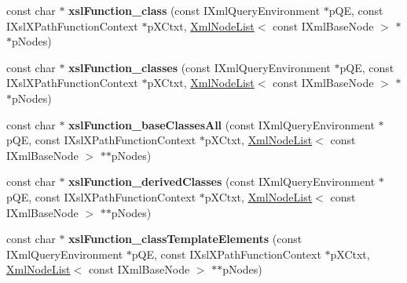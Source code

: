 \begin{DoxyCompactItemize}
\item 
\hypertarget{group__XSLModule-Functions_ga18e9a88a14db42649b02c6adb815b78a}{const char $\ast$ {\bfseries xsl\-Function\-\_\-class} (const \-I\-Xml\-Query\-Environment $\ast$p\-Q\-E, const \-I\-Xsl\-X\-Path\-Function\-Context $\ast$p\-X\-Ctxt, \hyperlink{classgeneral__server_1_1XmlNodeList}{\-Xml\-Node\-List}$<$ const \-I\-Xml\-Base\-Node $>$ $\ast$$\ast$p\-Nodes)}\label{group__XSLModule-Functions_ga18e9a88a14db42649b02c6adb815b78a}

\item 
\hypertarget{group__XSLModule-Functions_ga5e92759166ded9b8aa524e87e2256930}{const char $\ast$ {\bfseries xsl\-Function\-\_\-classes} (const \-I\-Xml\-Query\-Environment $\ast$p\-Q\-E, const \-I\-Xsl\-X\-Path\-Function\-Context $\ast$p\-X\-Ctxt, \hyperlink{classgeneral__server_1_1XmlNodeList}{\-Xml\-Node\-List}$<$ const \-I\-Xml\-Base\-Node $>$ $\ast$$\ast$p\-Nodes)}\label{group__XSLModule-Functions_ga5e92759166ded9b8aa524e87e2256930}

\item 
\hypertarget{group__XSLModule-Functions_ga840d1f80d66322355f2735ddf607837a}{const char $\ast$ {\bfseries xsl\-Function\-\_\-base\-Classes\-All} (const \-I\-Xml\-Query\-Environment $\ast$p\-Q\-E, const \-I\-Xsl\-X\-Path\-Function\-Context $\ast$p\-X\-Ctxt, \hyperlink{classgeneral__server_1_1XmlNodeList}{\-Xml\-Node\-List}$<$ const \-I\-Xml\-Base\-Node $>$ $\ast$$\ast$p\-Nodes)}\label{group__XSLModule-Functions_ga840d1f80d66322355f2735ddf607837a}

\item 
\hypertarget{group__XSLModule-Functions_ga830eb53620cc28de2d5beb595acaa0d3}{const char $\ast$ {\bfseries xsl\-Function\-\_\-derived\-Classes} (const \-I\-Xml\-Query\-Environment $\ast$p\-Q\-E, const \-I\-Xsl\-X\-Path\-Function\-Context $\ast$p\-X\-Ctxt, \hyperlink{classgeneral__server_1_1XmlNodeList}{\-Xml\-Node\-List}$<$ const \-I\-Xml\-Base\-Node $>$ $\ast$$\ast$p\-Nodes)}\label{group__XSLModule-Functions_ga830eb53620cc28de2d5beb595acaa0d3}

\item 
\hypertarget{group__XSLModule-Functions_gabcda62084d1363b5ab7186705b3a7bf3}{const char $\ast$ {\bfseries xsl\-Function\-\_\-class\-Template\-Elements} (const \-I\-Xml\-Query\-Environment $\ast$p\-Q\-E, const \-I\-Xsl\-X\-Path\-Function\-Context $\ast$p\-X\-Ctxt, \hyperlink{classgeneral__server_1_1XmlNodeList}{\-Xml\-Node\-List}$<$ const \-I\-Xml\-Base\-Node $>$ $\ast$$\ast$p\-Nodes)}\label{group__XSLModule-Functions_gabcda62084d1363b5ab7186705b3a7bf3}


\end{DoxyCompactItemize}
